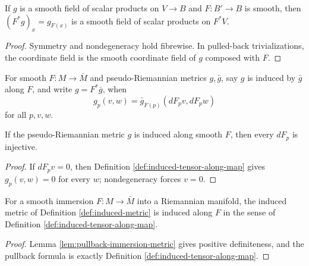 \begin{lemma}
\label{lem:pullback-pseudo-metric-bundle}





If $g$ is a smooth field of scalar products on $V\to B$ and $F:B'\to B$ is smooth, then $(F^*g)_x=g_{F(x)}$ is a smooth field of scalar products on $F^*V$.
\end{lemma}
\begin{proof}

\sketch Symmetry and nondegeneracy hold fibrewise. In pulled-back trivializations, the coordinate field is the smooth coordinate field of $g$ composed with $F$.
\end{proof}

\begin{definition}
\label{def:induced-tensor-along-map}





For smooth $F:M\to\bar M$ and pseudo-Riemannian metrics $g,\bar g$, say $g$ is induced by $\bar g$ along $F$, and write $g=F^*\bar g$, when
\[
g_p(v,w)=\bar g_{F(p)}(dF_pv,dF_pw)
\]
for all $p,v,w$.
\end{definition}

\begin{lemma}
\label{lem:pseudo-submanifold-immersion}





If the pseudo-Riemannian metric $g$ is induced along smooth $F$, then every $dF_p$ is injective.
\end{lemma}
\begin{proof}

\sketch If $dF_pv=0$, then Definition \ref{def:induced-tensor-along-map} gives $g_p(v,w)=0$ for every $w$; nondegeneracy forces $v=0$.
\end{proof}

\begin{lemma}
\label{lem:riemannian-submanifold-induced-tensor}





For a smooth immersion $F:M\to\bar M$ into a Riemannian manifold, the induced metric of Definition \ref{def:induced-metric} is induced along $F$ in the sense of Definition \ref{def:induced-tensor-along-map}.
\end{lemma}
\begin{proof}

\sketch Lemma \ref{lem:pullback-immersion-metric} gives positive definiteness, and the pullback formula is exactly Definition \ref{def:induced-tensor-along-map}.
\end{proof}

